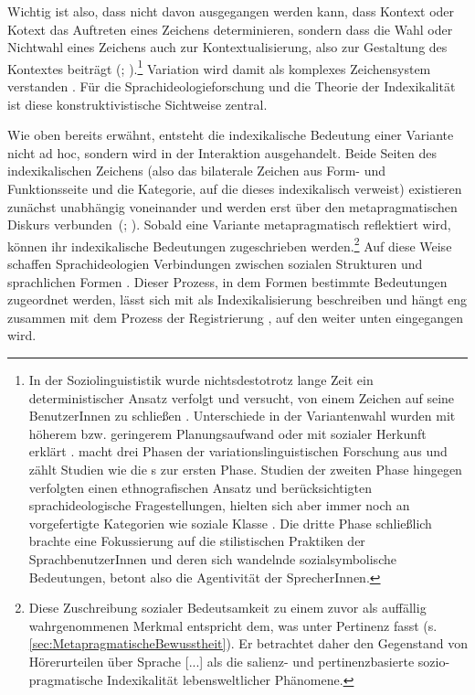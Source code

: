 Wichtig ist also, dass nicht davon ausgegangen werden kann, dass Kontext oder Kotext das Auftreten eines Zeichens determinieren, sondern dass die Wahl oder Nichtwahl eines Zeichens auch zur Kontextualisierung, also zur Gestaltung des Kontextes beiträgt (\citealp[s.][23]{Auer.1986}; \citealp[42--43]{Gumperz.1992b}).\footnote{In der Soziolinguististik wurde nichtsdestotrotz lange Zeit ein deterministischer Ansatz verfolgt und versucht, von einem Zeichen auf seine BenutzerInnen zu schließen \citep[s.][88--90]{Eckert2012}.
Unterschiede in der Variantenwahl wurden mit höherem bzw. geringerem Planungsaufwand oder mit sozialer Herkunft erklärt \citep[vgl. etwa die Kaufhausstudie von][]{Labov2006}.
\citet{Eckert2012} macht drei Phasen der variationslinguistischen Forschung aus und zählt Studien wie die \citeauthor{Labov2006}s zur ersten Phase.
Studien der zweiten Phase hingegen verfolgten einen ethnografischen Ansatz und berücksichtigten sprachideologische Fragestellungen, hielten sich aber immer noch an vorgefertigte Kategorien wie soziale Klasse \citep[s.][93]{Eckert2012}. Die dritte Phase schließlich brachte eine Fokussierung auf die stilistischen Praktiken der SprachbenutzerInnen und deren sich wandelnde sozialsymbolische Bedeutungen, betont also die Agentivität der SprecherInnen.} 
Variation wird damit als komplexes Zeichensystem verstanden \citep[s.][92]{Eckert2012}.
Für die Sprachideologieforschung und die Theorie der Indexikalität ist diese konstruktivistische Sichtweise zentral.

Wie oben bereits erwähnt, entsteht die indexikalische Bedeutung einer Variante nicht ad hoc, sondern wird in der Interaktion ausgehandelt. 
Beide Seiten des {in\-dexi\-ka\-li\-schen} Zeichens (also das bilaterale Zeichen aus Form- und Funktionsseite und die Kategorie, auf die dieses indexikalisch verweist) existieren zunächst unabh{\"a}ngig voneinander und werden erst über den metapragmatischen Diskurs verbunden~(\citealp[s.][316]{Silverstein1992}; \citealp[86]{Jaffe.2016}). 
Sobald eine Variante metapragmatisch reflektiert wird, können ihr indexikalische Bedeutungen zugeschrieben werden.\footnote{Diese Zuschreibung sozialer Bedeutsamkeit zu einem zuvor als auffällig wahrgenommenen Merkmal entspricht dem, was \citeauthor{Purschke2014} unter Pertinenz fasst (s. \autoref{sec:MetapragmatischeBewusstheit}). Er betrachtet daher den {\glqq}Gegenstand von Hörerurteilen über Sprache [...] als die salienz- und pertinenzbasierte sozio-pragmatische Indexikalität lebensweltlicher Phänomene{\grqq}\citep[44]{Purschke2014}.} 
Auf diese Weise schaffen Sprachideologien Verbindungen zwischen sozialen Strukturen und sprachlichen Formen \citep[s.][55]{Woolard1994}. 
Dieser Prozess, in dem Formen bestimmte Bedeutungen zugeordnet werden, lässt sich mit \citet[86]{Jaffe.2016} als Indexikalisierung beschreiben und hängt eng zusammen mit dem Prozess der Registrierung \citep[s.][]{Agha2007}, auf den weiter unten eingegangen wird.

